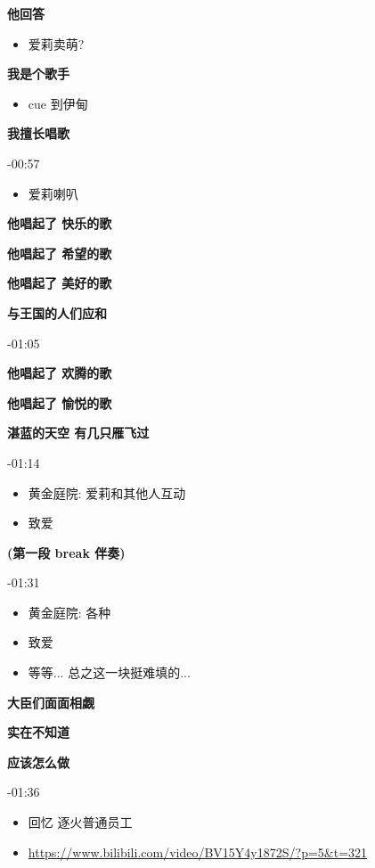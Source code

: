 \documentclass[a4paper]{article}
\begin{document}
\textbf{他回答}

\begin{itemize}
    \item 爱莉卖萌?
\end{itemize}

\textbf{我是个歌手}

\begin{itemize}
    \item cue 到伊甸
\end{itemize}

\textbf{我擅长唱歌}

-00:57

\begin{itemize}
    \item 爱莉喇叭
\end{itemize}

\textbf{他唱起了 快乐的歌}

\textbf{他唱起了 希望的歌}

\textbf{他唱起了 美好的歌}

\textbf{与王国的人们应和}

-01:05

\textbf{他唱起了 欢腾的歌}

\textbf{他唱起了 愉悦的歌}

\textbf{湛蓝的天空 有几只雁飞过}

-01:14

\begin{itemize}
    \item 黄金庭院: 爱莉和其他人互动
    \item 致爱
\end{itemize}

\textbf{(第一段 break 伴奏)}

-01:31

\begin{itemize}
    \item 黄金庭院: 各种
    \item 致爱
    \item 等等... 总之这一块挺难填的...
\end{itemize}

\textbf{大臣们面面相觑}

\textbf{实在不知道}

\textbf{应该怎么做}

-01:36

\begin{itemize}
    \item 回忆 逐火普通员工
    \item \url{https://www.bilibili.com/video/BV15Y4y1872S/?p=5&t=321}
\end{itemize}
\end{document}
